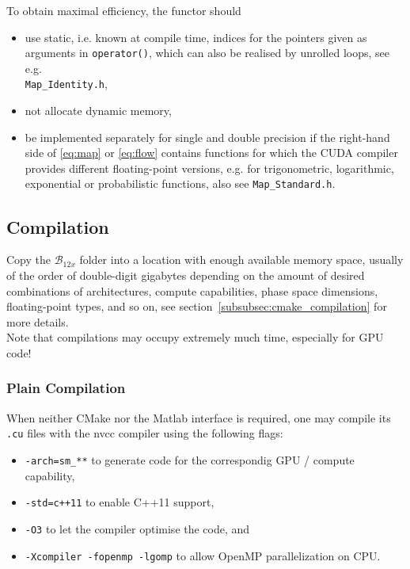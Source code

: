 \documentclass[a4paper,10pt,fleqn]{article}
\newcommand{\BTwelveVersion}[1]{\mathcal{B}_{12#1}}
\begin{document}
To obtain maximal efficiency, the functor should
\begin{itemize}
\item use static, i.e. known at compile time, indices for the pointers given as arguments in \verb$operator()$, which can also be realised by unrolled loops, see e.g.\\ \verb$Map_Identity.h$,
\item not allocate dynamic memory,
\item be implemented separately for single and double precision if the right-hand side of \eqref{eq:map} or \eqref{eq:flow} contains functions for which the CUDA compiler provides different floating-point versions, e.g. for trigonometric, logarithmic, exponential or probabilistic functions, also see \verb$Map_Standard.h$.
\end{itemize}


\subsection{Compilation} \label{subsec:compilation}

Copy the $\BTwelveVersion{x}$ folder into a location with enough available memory space, usually of the order of double-digit gigabytes depending on the amount of desired combinations of architectures, compute capabilities, phase space dimensions, floating-point types, and so on, see section~\ref{subsubsec:cmake_compilation} for more details.\\
Note that compilations may occupy extremely much time, especially for GPU code!

\subsubsection{Plain Compilation} \label{subsubsec:plain_compilation}

When neither CMake nor the Matlab interface is required, one may compile its \verb$.cu$ files with the nvcc compiler using the following flags:
\begin{itemize}
\item[] \verb$-arch=sm_**$ \; to generate code for the correspondig GPU / compute capability,
\item[] \verb$-std=c++11$ \; to enable C++11 support,
\item[] \verb$-O3$ \; to let the compiler optimise the code, and
\item[] \verb$-Xcompiler -fopenmp -lgomp$ \; to allow OpenMP parallelization on CPU.
\end{itemize}
\end{document}
